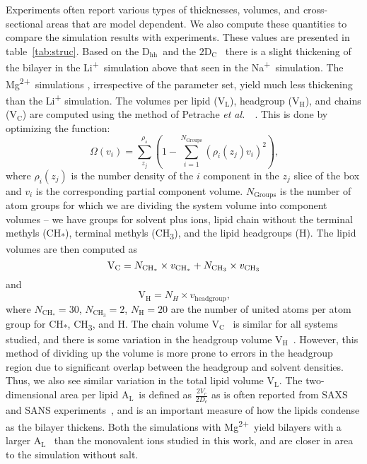\documentclass[journal=langd5,manuscript=article]{achemso}
\newcommand{\etal}{\textit{et al.}~}
\newcommand{\na}{Na\textsuperscript{+}~}
\newcommand{\li}{Li\textsuperscript{+}~}
\newcommand{\mg}{Mg\textsuperscript{2+}~}
\newcommand{\dhh}{$\text{D}_\text{hh}$}
\newcommand{\dc}{$\text{2D}_\text{C}$}
\newcommand{\al}{$\text{A}_{\text{L}}$}
\newcommand{\vl}{$\text{V}_{\text{L}}$}
\newcommand{\vh}{$\text{V}_{\text{H}}$}
\newcommand{\vc}{$\text{V}_{\text{C}}$}
\begin{document}
Experiments often report various types of thicknesses, volumes, and cross-sectional areas that are model dependent.
We also compute these quantities to compare the simulation results with experiments. These values are presented in 
table~\ref{tab:struc}.
Based on the \dhh~and the \dc~ there is a slight thickening 
of the bilayer in the \li {simulation} above that seen in the \na {simulation}.
The \mg simulations {, irrespective of the parameter set, yield} much less thickening than {the}  
Li\textsuperscript{+} {simulation.} 
{The volumes per lipid (\vl), headgroup (\vh), and chains (\vc) are computed using the method of
Petrache \etal~\cite{petrache:1997}. This is done by optimizing the function:
\begin{equation}
    \label{eq:volumeobj}
    \Omega(v_i)=\sum^{\rho_s}_{z_j}(1-\sum^{N_{\text{Groups}}}_{i=1}{(\rho_i(z_j)v_i)^2})\text{,}
\end{equation}
where $\rho_i(z_j)$ is the number density of the $i$ component in the
$z_j$ slice of the box and $v_i$ is the corresponding partial component volume. $N_\text{Groups}$ is the number
of atom groups for which we are dividing the system volume into component volumes -- we have groups for solvent plus ions,
lipid chain without the terminal methyls (CH\textsubscript{*}), terminal methyls (CH\textsubscript{3}), and the lipid headgroups (H).
The lipid volumes are then computed as 
\begin{equation}
    \text{\vc}=N_{\text{CH}_*} \times v_{\text{CH}_*}+N_{\text{CH}_3} \times v_{\text{CH\textsubscript{3}}}
\end{equation}
and
\begin{equation}
    \text{\vh}=N_{H} \times v_{\text{headgroup}}\text{,}
\end{equation}
where $N_{\text{CH}_*}=30$, $N_{\text{CH}_3}=2$, $N_{\text{H}}=20$ are the number of united atoms per atom group for CH\textsubscript{*},
CH\textsubscript{3}, and H.
}{
The chain volume \vc~ is similar for all systems studied, and there is some variation in the headgroup volume \vh~.
However, this method of dividing up the volume is more prone to errors in the headgroup region due to 
significant overlap between the headgroup and solvent densities. 
Thus, we also see similar variation in the total lipid volume \vl. 
}
The two-dimensional area per lipid \al~is defined as
{$\frac{2V_c}{2D_c}$ as is often reported from SAXS and SANS experiments~\cite{nagle:2000}, and is an important
measure of how the lipids condense as the bilayer thickens.}
{Both the simulations with \mg yield bilayers with a larger \al~ 
    than the monovalent ions studied in this work, and are closer
in area to the simulation without salt.
}
\end{document}
